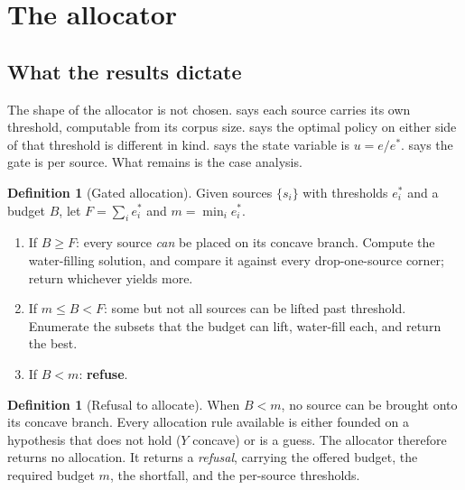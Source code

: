 \documentclass[11pt,twocolumn,a4paper]{article}
\theoremstyle{thmstyle}
\theoremstyle{definition}
\newtheorem{definition}[theorem]{Definition}
\theoremstyle{remark}
\newcommand{\eff}{e}
\newcommand{\estar}{e^{*}}
\newcommand{\yield}{Y}
\begin{document}


\section{The allocator}
\label{sec:allocator}

\subsection{What the results dictate}

The shape of the allocator is not chosen.  says each
source carries its own threshold, computable from its corpus size.
 says the optimal policy on either side of that
threshold is different in kind.  says the state
variable is $u=\eff/\estar$.  says the gate is per
source. What remains is the case analysis.

\begin{definition}[Gated allocation]
\label{def:gated}
Given sources $\{s_i\}$ with thresholds $\estar_i$ and a budget $B$, let
$F=\sum_i \estar_i$ and $m=\min_i\estar_i$.
\begin{enumerate}[label=(\arabic*),leftmargin=1.8em,itemsep=2pt]
\item If $B\ge F$: every source \emph{can} be placed on its concave
branch. Compute the water-filling solution, and compare it against every
drop-one-source corner; return whichever yields more.
\item If $m\le B<F$: some but not all sources can be lifted past
threshold. Enumerate the subsets that the budget can lift, water-fill
each, and return the best.
\item If $B<m$: \textbf{refuse}.
\end{enumerate}
\end{definition}

\begin{definition}[Refusal to allocate]
\label{def:refuse-allocate}
When $B<m$, no source can be brought onto its concave branch. Every
allocation rule available is either founded on a hypothesis that does not
hold ($\yield$ concave) or is a guess. The allocator therefore returns no
allocation. It returns a \emph{refusal}, carrying the offered budget, the
required budget $m$, the shortfall, and the per-source thresholds.
\end{definition}
\end{document}
